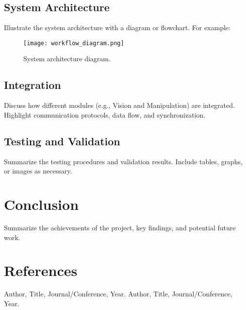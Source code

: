 \documentclass[12pt,a4paper]{article}
\begin{document}
\subsection{System Architecture}\label{subsec:systemarchitecture}
Illustrate the system architecture with a diagram or flowchart. For example:
\begin{figure}[h!]
    \centering
    \texttt{[image: workflow\_diagram.png]} %
    \caption{System architecture diagram.}
    \label{fig:workflow_diagram}
\end{figure}

\subsection{Integration}\label{subsec:integration}
Discuss how different modules (e.g., Vision and Manipulation) are integrated. Highlight communication protocols, data flow, and synchronization.

\subsection{Testing and Validation}\label{subsec:testing}
Summarize the testing procedures and validation results. Include tables, graphs, or images as necessary.

\section{Conclusion}\label{sec:conclusion}
Summarize the achievements of the project, key findings, and potential future work. 

\section*{References}
\begin{thebibliography}{99}
     Author, Title, Journal/Conference, Year.
     Author, Title, Journal/Conference, Year.
\end{thebibliography}
\end{document}

